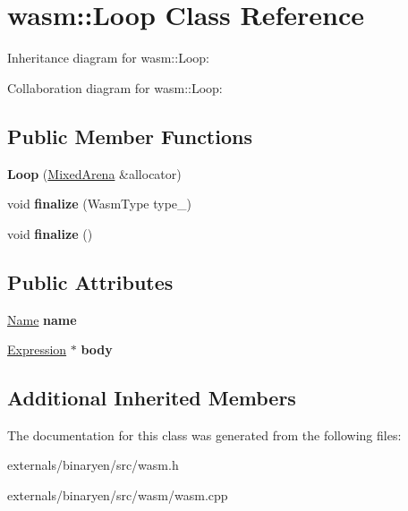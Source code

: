 \hypertarget{classwasm_1_1_loop}{}\section{wasm\+:\+:Loop Class Reference}
\label{classwasm_1_1_loop}


Inheritance diagram for wasm\+:\+:Loop\+:


Collaboration diagram for wasm\+:\+:Loop\+:
\subsection*{Public Member Functions}
\begin{DoxyCompactItemize}
\item 
\mbox{\label{classwasm_1_1_loop_a841f2e6ddd463b91077046b904381d14}} 
{\bfseries Loop} (\mbox{\hyperlink{struct_mixed_arena}{Mixed\+Arena}} \&allocator)
\item 
\mbox{\label{classwasm_1_1_loop_a39a766a3f3d36d1375641461fc16d6b5}} 
void {\bfseries finalize} (Wasm\+Type type\+\_\+)
\item 
\mbox{\label{classwasm_1_1_loop_a38e729567cd714944f7148af53d2dbf3}} 
void {\bfseries finalize} ()
\end{DoxyCompactItemize}
\subsection*{Public Attributes}
\begin{DoxyCompactItemize}
\item 
\mbox{\label{classwasm_1_1_loop_a05dc6dd522131c1f54cf393350f48cca}} 
\mbox{\hyperlink{structwasm_1_1_name}{Name}} {\bfseries name}
\item 
\mbox{\label{classwasm_1_1_loop_a5b3448e7a813a4a9c6d920369d755f59}} 
\mbox{\hyperlink{classwasm_1_1_expression}{Expression}} $\ast$ {\bfseries body}
\end{DoxyCompactItemize}
\subsection*{Additional Inherited Members}


The documentation for this class was generated from the following files\+:\begin{DoxyCompactItemize}
\item 
externals/binaryen/src/wasm.\+h\item 
externals/binaryen/src/wasm/wasm.\+cpp\end{DoxyCompactItemize}
